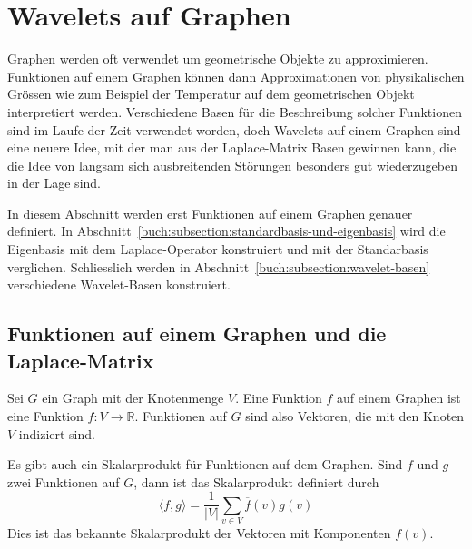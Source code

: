 %
%
%
\section{Wavelets auf Graphen
\label{buch:section:wavelets-auf-graphen}}
Graphen werden oft verwendet um geometrische Objekte zu approximieren.
Funktionen auf einem Graphen können dann Approximationen von physikalischen
Grössen wie zum Beispiel der Temperatur auf dem geometrischen Objekt
interpretiert werden.
Verschiedene Basen für die Beschreibung solcher Funktionen sind im Laufe
der Zeit verwendet worden, doch Wavelets auf einem Graphen sind eine
neuere Idee, mit der man aus der Laplace-Matrix Basen gewinnen kann,
die die Idee von langsam sich ausbreitenden Störungen besonders gut
wiederzugeben in der Lage sind.

In diesem Abschnitt werden erst Funktionen auf einem Graphen genauer
definiert.
In Abschnitt~\ref{buch:subsection:standardbasis-und-eigenbasis}
wird die Eigenbasis mit dem Laplace-Operator konstruiert und mit
der Standarbasis verglichen.
Schliesslich werden in Abschnitt~\ref{buch:subsection:wavelet-basen}
verschiedene Wavelet-Basen konstruiert.

\subsection{Funktionen auf einem Graphen und die Laplace-Matrix}
Sei $G$ ein Graph mit der Knotenmenge $V$.
Eine Funktion $f$ auf einem Graphen ist eine Funktion $f\colon V\to\mathbb{R}$.
Funktionen auf $G$ sind also Vektoren, die mit den Knoten $V$ indiziert
sind.

Es gibt auch ein Skalarprodukt für Funktionen auf dem Graphen.
Sind $f$ und $g$ zwei Funktionen auf $G$, dann ist das Skalarprodukt
definiert durch
\[
\langle f,g\rangle
=
\frac{1}{|V|}\sum_{v\in V} \overline{f}(v) g(v)
\]
Dies ist das bekannte Skalarprodukt der Vektoren mit Komponenten $f(v)$.

